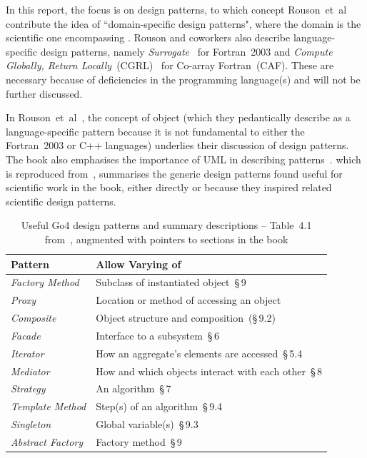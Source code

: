 In this report, the focus is on design patterns,
to which concept Rouson~et~al~\cite{rousonxiaxu} contribute the idea of  ``domain-specific design patterns",
where the domain is the scientific one encompassing \nep. Rouson and coworkers also describe language-specific
design patterns, namely {\it Surrogate}~\cite[\S\,7]{rousonxiaxu} for Fortran~2003 and
{\it Compute Globally, Return Locally}~(CGRL)~\cite{Ha15High} for
Co-array Fortran~(CAF). These are necessary because of deficiencies in the programming language(s)
and will not be further discussed.

In Rouson~et~al~\cite[\S\,5]{rousonxiaxu}, the concept of object (which they pedantically
describe as a language-specific pattern because it is not fundamental to either the Fortran~2003 or C++ languages)
underlies their discussion of design patterns. The book also emphasises the importance of UML
in describing patterns~\cite[\S\,B]{rousonxiaxu}.
 which is reproduced from~\cite{rousonxiaxu}, summarises
the generic design patterns found useful for scientific work in the book, either directly or because
they inspired related scientific design patterns.

\begin{table}[h]
\begin{center}
\caption{Useful Go4 design patterns and summary descriptions -- 
Table~4.1 from~\cite{rousonxiaxu}, augmented with pointers
to sections in the book \label{tab:rousonpats}}
\begin{tabular}{|p{3cm}|p{12cm}|}
\hline
Pattern	& Allow Varying of  \\
\hline
{\it Factory Method} & Subclass of instantiated object~\S\,9  \\
{\it Proxy} & Location or method of accessing an object  \\
{\it Composite} & Object structure and composition~(\S\,9.2)  \\
{\it Facade} & Interface to a subsystem~\S\,6 \\
{\it Iterator} & How an aggregate's elements are accessed~\S\,5.4  \\
{\it Mediator} & How and which objects interact with each other~\S\,8  \\
{\it Strategy} & An algorithm~\S\,7  \\
{\it Template Method} & Step(s) of an algorithm~\S\,9.4  \\
{\it Singleton} & Global variable(s)~\S\,9.3  \\
{\it Abstract Factory} & Factory method~\S\,9  \\
\hline
\end{tabular}
\end{center}
\end{table}


